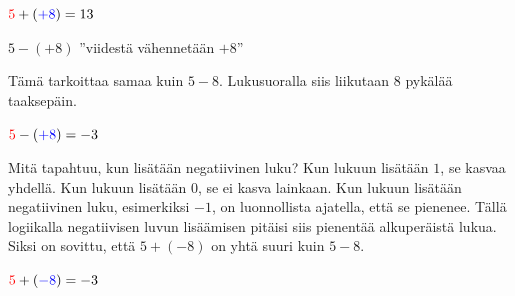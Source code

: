     \begin{center}
          \begin{lukusuora}{-1}{14}{14}
        {\color{red} }
        \lukusuorauusi
        {\color{red} }
        {\color{blue} }
       \end{lukusuora}
       ${\color{red}5}+({\color{blue}+8})=13$
    \end{center}
    
    $5-(+8)$ ''viidestä vähennetään $+8$''
    
    Tämä tarkoittaa samaa kuin $5-8$. Lukusuoralla siis liikutaan 8 pykälää taaksepäin.

\vspace{0.3cm}     
    
    \begin{center}
              \begin{lukusuora}{-4}{8}{14}
        {\color{blue} }
        \lukusuorauusi
        {\color{red} }
       \end{lukusuora}
       ${\color{red}5}-({\color{blue}+8})=-3$
    \end{center}


    
    Mitä tapahtuu, kun lisätään negatiivinen luku? Kun lukuun lisätään $1$, se kasvaa yhdellä. Kun lukuun lisätään $0$, se ei kasva lainkaan. Kun lukuun lisätään negatiivinen luku, esimerkiksi $-1$, on luonnollista ajatella, että se pienenee. Tällä logiikalla negatiivisen luvun lisäämisen pitäisi siis pienentää alkuperäistä lukua. Siksi on sovittu, että $5+(-8)$ on yhtä suuri kuin $5-8$.
    
\vspace{0.3cm}     

    \begin{center}
                 \begin{lukusuora}{-4}{8}{14}
        {\color{blue} }
        \lukusuorauusi
        {\color{red} }
       \end{lukusuora}
       ${\color{red}5}+({\color{blue}-8})=-3$
    \end{center}
    
